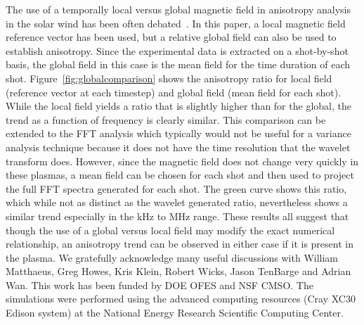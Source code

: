 \documentclass[manuscript]{aastex}
\begin{document}
The use of a temporally local versus global magnetic field in anisotropy analysis in the solar wind has been often debated~\citep{pod09,mat12}. In this paper, a local magnetic field reference vector has been used, but a relative global field can also be used to establish anisotropy. Since the experimental data is extracted on a shot-by-shot basis, the global field in this case is the mean field for the time duration of each shot. Figure~\ref{fig:globalcomparison} shows the anisotropy ratio for local field (reference vector at each timestep) and global field (mean field for each shot). While the local field yields a ratio that is slightly higher than for the global, the trend as a function of frequency is clearly similar. This comparison can be extended to the FFT analysis which typically would not be useful for a variance analysis technique because it does not have the time resolution that the wavelet transform does. However, since the magnetic field does not change very quickly in these plasmas, a mean field can be chosen for each shot and then used to project the full FFT spectra generated for each shot. The green curve shows this ratio, which while not as distinct as the wavelet generated ratio, nevertheless shows a similar trend especially in the kHz to MHz range. These results all suggest that though the use of a global versus local field may modify the exact numerical relationship, an anisotropy trend can be observed in either case if it is present in the plasma.
\acknowledgements
We gratefully acknowledge many useful discussions with William Matthaeus, Greg Howes, Kris Klein, Robert Wicks, Jason TenBarge and Adrian Wan. This work has been funded by DOE OFES and NSF CMSO.  The simulations were performed using the advanced computing resources (Cray XC30 Edison system) at the National Energy Research Scientific Computing Center.
\end{document}
